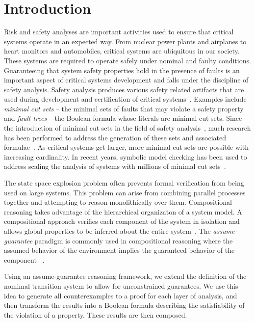 \section{Introduction}
\label{sec:intro}

Risk and safety analyses are important activities used to ensure that critical systems operate in an expected way. From nuclear power plants and airplanes to heart monitors and automobiles, critical systems are ubiquitous in our society. These systems are required to operate safely under nominal and faulty conditions. Guaranteeing that system safety properties hold in the presence of faults is an important aspect of critical systems development and falls under the discipline of safety analysis. Safety analysis produces various safety related artifacts that are used during development and certification of critical systems~\cite{SAE:ARP4761,SAE:ARP4754A}. Examples include {\em minimal cut sets} -- the minimal sets of faults that may violate a safety property and {\em fault trees} -- the Boolean formula whose literals are minimal cut sets. Since the introduction of minimal cut sets in the field of safety analysis~\cite{vesely1981fault}, much research has been performed to address the generation of these sets and associated formulae~\cite{fta:survey,rauzy1993new,historyFTA,Bozzano:2010:DSA:1951720,rausand2003system}. As critical systems get larger, more minimal cut sets are possible with increasing cardinality. In recent years, symbolic model checking has been used to address scaling the analysis of systems with millions of minimal cut sets~\cite{bieber2002combination,schafer2003combining,fta:survey,contractBasedDesign,symbFTA,DBLP:conf/cav/BozzanoCPJKPRT15}. 

The state space explosion problem often prevents formal verification from being used on large systems. This problem can arise from combining parallel processes together and attempting to reason monolithically over them. Compositional reasoning takes advantage of the hierarchical organizaton of a system model. A compositional approach verifies each component of the system in isolation and allows global properties to be inferred about the entire system~\cite{berezin1997compositional}. The {\em assume-guarantee} paradigm is commonly used in compositional reasoning where the assumed behavior of the environment implies the guaranteed behavior of the component ~\cite{NFM2012:CoGaMiWhLaLu}.

Using an assume-guarantee reasoning framework, we extend the definition of the nomimal transition system to allow for unconstrained guarantees. We use this idea to generate all counterexamples to a proof for each layer of analysis, and then transform the results into a Boolean formula describing the satisfiability of the violation of a property. These results are then composed. 

